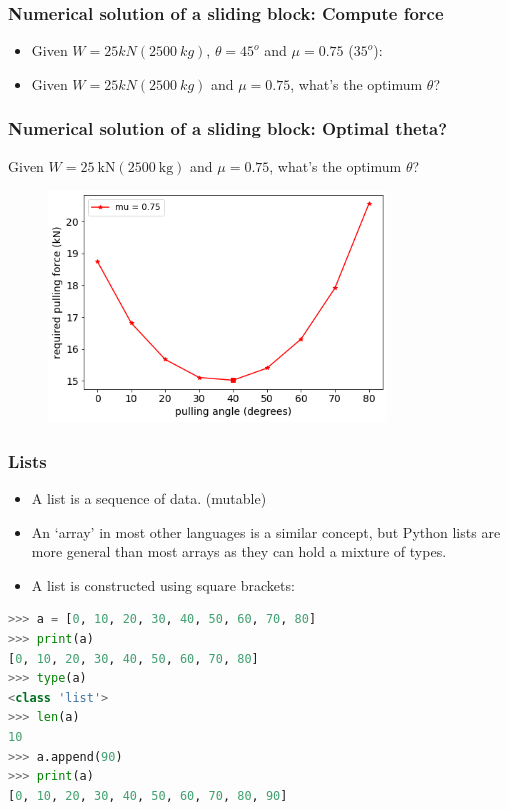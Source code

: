 \documentclass[handout]{beamer}
\begin{document}
\begin{frame}
	\frametitle{Numerical solution of a sliding block: Compute force}
	\begin{itemize}
		\item Given $W = 25 kN (\SI{2500}{kg})$, $\theta = 45^o$ and $\mu = 0.75$ ($35^o$):
		\mode<beamer>{	
			\begin{equation*}
			F = \frac{0.75 \times 25 }{\cos(45) + 0.75 \sin(45)} = \SI{15.15}{kN}.
			\end{equation*}
		}
		\mode<handout>{
			\vspace{2.5cm}
		}
		\item Given $W = 25 kN (\SI{2500}{kg})$ and $\mu = 0.75$, what's the optimum $\theta$?
	\end{itemize}
\end{frame}

\begin{frame}
	\frametitle{\faCommentsO Numerical solution of a sliding block: Optimal theta?}
	Given $W = \SI{25}{\kilo\newton} (\SI{2500}{\kilogram})$ and $\mu = 0.75$, what's the optimum $\theta$?
	\begin{figure}[ht]
		\centering
		\includegraphics[width=0.8\textwidth]{figs/sliding-block-mu0p75-10.png}
	\end{figure}
\end{frame}

\begin{frame}[fragile]
	\frametitle{Lists}
	\begin{itemize}
		\item A list is a sequence of data. (mutable)
		\item An `array' in most other languages is a similar concept, but Python lists are more general than most arrays as they can hold a mixture of types. 
		\item A list is constructed using square brackets:
	\end{itemize}
	\begin{lstlisting}[language=Python]
>>> a = [0, 10, 20, 30, 40, 50, 60, 70, 80]
>>> print(a)
[0, 10, 20, 30, 40, 50, 60, 70, 80]
>>> type(a)
<class 'list'>
>>> len(a)
10
>>> a.append(90)
>>> print(a)
[0, 10, 20, 30, 40, 50, 60, 70, 80, 90]
	\end{lstlisting}
\end{frame}
\end{document}

